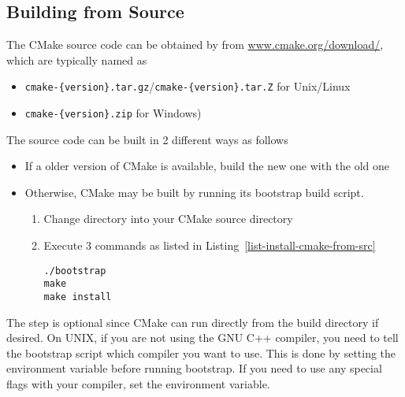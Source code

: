 \subsection{Building from Source}
  The CMake source code can be obtained by from \url{www.cmake.org/download/}, which are typically named as 
  \begin{itemize}  
    \item \texttt{cmake-\{version\}.tar.gz}/\texttt{cmake-\{version\}.tar.Z} for Unix/Linux 
    \item \texttt{cmake-\{version\}.zip} for Windows)
  \end{itemize}   
  The source code can be built in 2 different ways as follows
  \begin{itemize}  
    \item If a older version of CMake is available, build the new one with the old one
    \item Otherwise, CMake may be built by running its bootstrap build script. 
      \begin{enumerate}  
        \item Change directory into your CMake source directory
        \item Execute 3 commands as listed in Listing~\ref{list-install-cmake-from-src}
\begin{lstlisting}[caption={Install CMake by the bootstrap script}, label=list-install-cmake-from-src]
./bootstrap
make
make install
\end{lstlisting}
      \end{enumerate}  
  \end{itemize}  
  The  step is optional since CMake can run directly from the build directory if desired. On UNIX, if you are not using the GNU C++ compiler, you need to tell the bootstrap script which compiler you want to use. This is done by setting the environment variable  before running bootstrap. If you need to use any special flags with your compiler, set the  environment variable.

